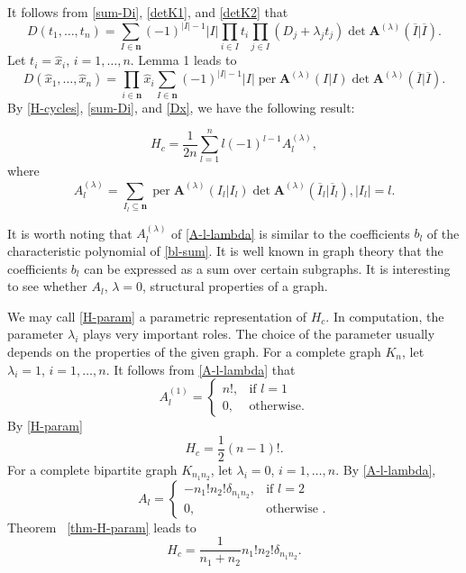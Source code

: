 \documentclass[mlq,fleqn]{w-art}
\DeclareMathOperator{\per}{per}
\newcommand{\envert}[1]{\left\lvert#1\right\rvert}
\let\abs=\envert
\begin{document}
It follows from \eqref{sum-Di}, \eqref{detK1}, and \eqref{detK2} that
\begin{equation}\label{Dt}
D(t_1,\dots,t_n)=\sum_{I\in\mathbf{n}}(-1)^{\abs{I}-1}\abs{I}
\prod_{i\in I}t_i\prod_{j\in I}(D_j+\lambda_jt_j)\det\mathbf{A}^{(\lambda)}
(\overline I|\overline I).
\end{equation}
Let $t_i=\hat x_i$, $i=1,\dots,n$. Lemma 1 leads to
\begin{equation}\label{Dx}
D(\hat x_1,\dots,\hat x_n)=\prod_{i\in\mathbf{n}}\hat x_i
\sum_{I\in\mathbf{n}}(-1)^{\abs{I}-1}\abs{I}\per \mathbf{A}
^{(\lambda)}(I|I)\det\mathbf{A}^{(\lambda)}(\overline I|\overline I).
\end{equation}
By \eqref{H-cycles}, \eqref{sum-Di}, and \eqref{Dx},
we have the following result:
\begin{thm}\label{thm-H-param}
\begin{equation}\label{H-param}
H_c=\frac{1}{2n}\sum^n_{l =1}l (-1)^{l -1}A_{l}
^{(\lambda)},
\end{equation}
where
\begin{equation}\label{A-l-lambda}
A^{(\lambda)}_l =\sum_{I_l \subseteq\mathbf{n}}\per \mathbf{A}
^{(\lambda)}(I_l |I_l )\det\mathbf{A}^{(\lambda)}
(\overline I_{l}|\overline I_l ),\abs{I_{l}}=l .
\end{equation}
\end{thm}

It is worth noting that $A_l ^{(\lambda)}$ of \eqref{A-l-lambda} is
similar to the coefficients $b_l $ of the characteristic polynomial of
\eqref{bl-sum}. It is well known in graph theory that the coefficients
$b_l $ can be expressed as a sum over certain subgraphs. It is
interesting to see whether $A_l $, $\lambda=0$, structural properties
of a graph.

We may call \eqref{H-param} a parametric representation of $H_c$. In
computation, the parameter $\lambda_i$ plays very important roles. The
choice of the parameter usually depends on the properties of the given
graph. For a complete graph $K_n$, let $\lambda_i=1$, $i=1,\dots,n$.
It follows from \eqref{A-l-lambda} that
\begin{equation}\label{compl-gr}
A^{(1)}_l =\begin{cases} n!,&\text{if }l =1\\
0,&\text{otherwise}.\end{cases}
\end{equation}
By \eqref{H-param}
\begin{equation}
H_c=\frac 12(n-1)!.
\end{equation}
For a complete bipartite graph $K_{n_1n_2}$, let $\lambda_i=0$, $i=1,\dots,n$.
By \eqref{A-l-lambda},
\begin{equation}
A_l =
\begin{cases} -n_1!n_2!\delta_{n_1n_2},&\text{if }l =2\\
0,&\text{otherwise }.\end{cases}
\label{compl-bip-gr}
\end{equation}
Theorem ~\ref{thm-H-param}
leads to
\begin{equation}
H_c=\frac1{n_1+n_2}n_1!n_2!\delta_{n_1n_2}.
\end{equation}
\end{document}
